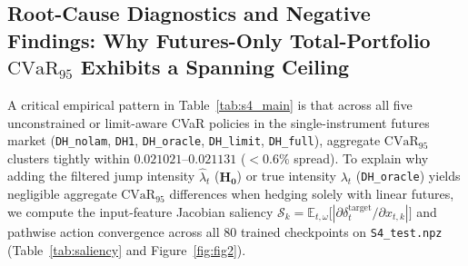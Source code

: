 \documentclass[11pt,a4paper]{article}
\begin{document}
\subsection{Root-Cause Diagnostics and Negative Findings: Why Futures-Only Total-Portfolio $\text{CVaR}_{95}$ Exhibits a Spanning Ceiling}
\label{sec:diagnostics}
A critical empirical pattern in Table~\ref{tab:s4_main} is that across all five unconstrained or limit-aware CVaR policies in the single-instrument futures market (\texttt{DH\_nolam}, \texttt{DH1}, \texttt{DH\_oracle}, \texttt{DH\_limit}, \texttt{DH\_full}), aggregate $\text{CVaR}_{95}$ clusters tightly within $0.021021\text{--}0.021131$ ($<0.6\%$ spread). To explain why adding the filtered jump intensity $\hat{\lambda}_t$ ($\mathbf{H_0}$) or true intensity $\lambda_t$ (\texttt{DH\_oracle}) yields negligible aggregate $\text{CVaR}_{95}$ differences when hedging solely with linear futures, we compute the input-feature Jacobian saliency $\mathcal{S}_k = \mathbb{E}_{t,\omega}\big[|\partial \delta_t^{\text{target}} / \partial x_{t,k}|\big]$ and pathwise action convergence across all 80 trained checkpoints on \texttt{S4\_test.npz} (Table~\ref{tab:saliency} and Figure~\ref{fig:fig2}).

\begin{table}[htbp]
  \centering
  \caption{Input-feature Jacobian saliency shares and pathwise action convergence in the S4 futures-only benchmark ($80$ checkpoints across $10$ seeds, \texttt{ddof=1}).}
  \label{tab:saliency}
\end{table}
\end{document}
